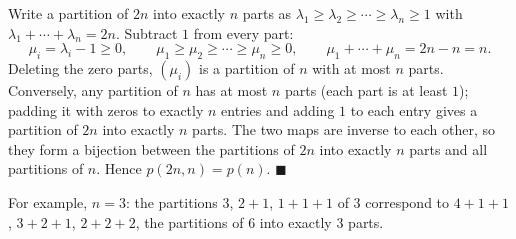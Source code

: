 Write a partition of $2n$ into exactly $n$ parts as $\lambda_1\ge\lambda_2\ge\cdots\ge\lambda_n\ge1$ with $\lambda_1+\cdots+\lambda_n=2n$. Subtract $1$ from every part:
\[
\mu_i=\lambda_i-1\ge0,\qquad \mu_1\ge\mu_2\ge\cdots\ge\mu_n\ge0,\qquad \mu_1+\cdots+\mu_n=2n-n=n .
\]
Deleting the zero parts, $(\mu_i)$ is a partition of $n$ with at most $n$ parts. Conversely, any partition of $n$ has at most $n$ parts (each part is at least $1$); padding it with zeros to exactly $n$ entries and adding $1$ to each entry gives a partition of $2n$ into exactly $n$ parts. The two maps are inverse to each other, so they form a bijection between the partitions of $2n$ into exactly $n$ parts and all partitions of $n$. Hence $p(2n,n)=p(n)$. $\blacksquare$

For example, $n=3$: the partitions $3$, $2+1$, $1+1+1$ of $3$ correspond to $4+1+1$, $3+2+1$, $2+2+2$, the partitions of $6$ into exactly $3$ parts.
